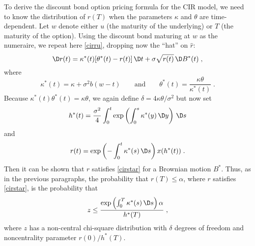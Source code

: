 To derive the discount bond option pricing formula for the CIR model, we need to know the distribution of $r(T)$ when the parameters $\kappa$ and $\theta$ are time-dependent.  Let $w$ denote either $u$ (the maturity of the underlying) or $T$ (the maturity of the option).  Using the discount bond maturing at $w$ as the numeraire, we repeat here  \eqref{cirru}, dropping now the ``hat'' on $\hat{r}$:
\begin{equation}\label{cirstar}
\D r(t)= \kappa^*(t)[\theta^*(t)-r(t)]\,\D t +\sigma \sqrt{r(t)}\,\D B^*(t)\;,
\end{equation}
where
$$
\kappa^*(t) = \kappa + \sigma^2b(w-t) \qquad \text{and} \qquad \theta^*(t) = \frac{\kappa\theta}{\kappa^*(t)}\; .$$
Because $\kappa^*(t)\theta^*(t) = \kappa\theta$, we again define $\delta = 4 \kappa
\theta/ \sigma^2$ but now set
$$h^*(t) = \frac{ \sigma^2}{4}\int_0^t \exp\left(
\int _0^s \kappa^*(y)\,\D y \right) \,\D s$$
and
$$r(t) = \exp\left(-\int_0^t \kappa^*(s)\,\D s\right)x(h^*(t))\; .$$
Then it can be shown that $r$ satisfies \eqref{cirstar} for a Brownian motion $B^*$.  Thus, as in the previous paragraphs, the probability that $r(T) \leq \alpha$, where $r$ satisfies \eqref{cirstar}, is the probability that
$$z \leq \frac{\exp\left(\int_0^T \kappa^*(s)\,\D s\right)\alpha}{h^*(T)}\; ,$$
where $z$ has a non-central chi-square distribution with $\delta$ degrees of freedom and noncentrality parameter $r(0)/h^*(T)$.

